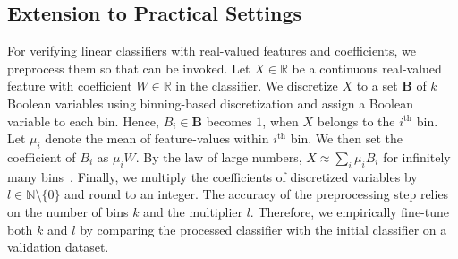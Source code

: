 	
	
	\subsection{Extension to Practical Settings}\label{fvgm_sec:practical}
	For verifying linear classifiers with real-valued features and coefficients, we preprocess them so that {\fvgm} can be invoked. Let $ X \in \mathbb{R} $ be a continuous real-valued feature with coefficient $ W \in \mathbb{R} $ in the classifier. We discretize $ X $ to a set $ \mathbf{B} $ of $ k $ Boolean variables using binning-based discretization and assign a Boolean variable to each bin. Hence, $ B_i \in \mathbf{B} $ becomes $ 1 $, when $ X $ belongs to the $ i^\text{th} $ bin. Let $ \mu_i $ denote the mean of feature-values within $ i^\text{th} $ bin. We then set the coefficient of $ B_i $ as $ \mu_iW $. By the law of large numbers, $ X \approx \sum_i \mu_iB_i $ for infinitely many bins~\cite{grimmett2020probability}. Finally, we multiply the coefficients of discretized variables by $ l \in \mathbb{N} \setminus \{0\} $ and round to an integer. The accuracy of the preprocessing step relies on the number of bins $ k $ and the multiplier $ l $. Therefore, we empirically fine-tune both $ k $ and $ l $ by comparing  the processed classifier with the initial classifier on a validation dataset.
\begin{comment}
	\begin{figure}
		\centering
		\subfloat[Exploration tree of stochastic sub-set sum problem.]{	\texttt{[image: figures/exploration\_tree\_DP]}\label{fvgm_fig:example_dp}}
		\subfloat[Bayesian network]{\texttt{[image: figures/example\_BN]}\label{fvgm_fig:example_BN}}
		\subfloat[Exploration tree of stochastic sub-set sum problem with Bayesian network]{\texttt{[image: figures/exploration\_tree\_DP\_BN]}	\label{fvgm_fig:example_dp_BN}
		}
		
	\end{figure}
\end{comment}


